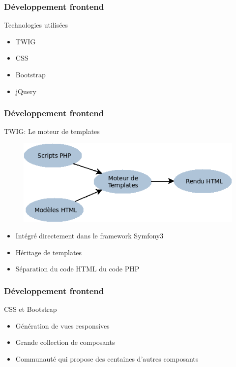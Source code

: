 \speaker{\Juliana}

\begin{frame}
\frametitle{Développement frontend}
\begin{block}{Technologies utilisées}
	\begin{itemize}
		\item TWIG
		\item CSS
		\item Bootstrap
		\item jQuery
	\end{itemize}
\end{block}
\end{frame}

\begin{frame}
\frametitle{Développement frontend}
\begin{block}{TWIG: Le moteur de templates }

\begin{minipage}[c]{.45\linewidth}
      \begin{figure}[r]
		\includegraphics[scale=0.3]{images/moteursTemp.png}
	  \end{figure}
\end{minipage} \hfill
\begin{minipage}[c]{.42\linewidth}
	
		\begin{itemize}
			\item Intégré directement dans le framework Symfony3
			\item Héritage de templates
			\item Séparation du code HTML du code PHP
		\end{itemize}
	
\end{minipage} \hfill
\end{block}
\end{frame}

\begin{frame}
\frametitle{Développement frontend}
\begin{block}{ CSS et Bootstrap }
	\begin{itemize}
		\item Génération de vues responsives
		\item Grande collection de composants
		\item Communauté qui propose des centaines d'autres composants
	\end{itemize}
\end{block}
\end{frame}

